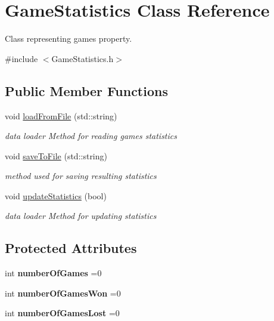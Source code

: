 \hypertarget{class_game_statistics}{}\section{Game\+Statistics Class Reference}
\label{class_game_statistics}


Class representing game\textquotesingle{}s property.  




{\ttfamily \#include $<$Game\+Statistics.\+h$>$}

\subsection*{Public Member Functions}
\begin{DoxyCompactItemize}
\item 
\mbox{\label{class_game_statistics_ab7bf8318cfae5d8f313aa27eec35fe13}} 
void \mbox{\hyperlink{class_game_statistics_ab7bf8318cfae5d8f313aa27eec35fe13}{load\+From\+File}} (std\+::string)
\begin{DoxyCompactList}\small\item\em data loader Method for reading game\textquotesingle{}s statistics \end{DoxyCompactList}\item 
void \mbox{\hyperlink{class_game_statistics_a74a4872e00ef08aa7f65a3a73a8c2ce0}{save\+To\+File}} (std\+::string)
\begin{DoxyCompactList}\small\item\em method used for saving resulting statistics \end{DoxyCompactList}\item 
void \mbox{\hyperlink{class_game_statistics_a9f1f6c74719aa14537bc973ad6db83cd}{update\+Statistics}} (bool)
\begin{DoxyCompactList}\small\item\em data loader Method for updating statistics \end{DoxyCompactList}\end{DoxyCompactItemize}
\subsection*{Protected Attributes}
\begin{DoxyCompactItemize}
\item 
\mbox{\label{class_game_statistics_a0f1fc054227129fc03d4a508ad956c4f}} 
int {\bfseries number\+Of\+Games} =0
\item 
\mbox{\label{class_game_statistics_a5ce2c11b961772881566c02875514584}} 
int {\bfseries number\+Of\+Games\+Won} =0
\item 
\mbox{\label{class_game_statistics_a86a74277d8aeb80d2708dfafa152548e}} 
int {\bfseries number\+Of\+Games\+Lost} =0
\end{DoxyCompactItemize}


